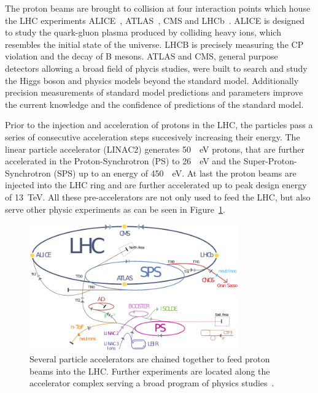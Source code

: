 The proton beams are brought to collision at four interaction points which house
the LHC experiments ALICE~\cite{ALICE}, ATLAS~\cite{ATLASa}, CMS and
LHCb~\cite{LHCb}. ALICE is designed to study the quark-gluon plasma produced by
colliding heavy ions, which resembles the initial state of the universe. LHCB is
precisely measuring the CP violation and the decay of B mesons. ATLAS and CMS,
general purpose detectors allowing a broad field of phycis studies, were built
to search and study the Higgs boson and physics models beyond the standard
model. Additionally precision measurements of standard model predictions and
parameters improve the current knowledge and the confidence of predictions of
the standard model.

Prior to the injection and acceleration of protons in the LHC, the particles
pass a series of consecutive acceleration steps succesively increasing their
energy. The linear particle accelerator (LINAC2) generates \SI{50}{\mega
\electronvolt} protons, that
are further accelerated in the Proton-Synchrotron (PS) to \SI{26}{\giga
\electronvolt} and
the Super-Proton-Synchrotron (SPS) up to an energy of \SI{450}{\giga
\electronvolt}. At last the proton beams are injected into the LHC ring and are
further accelerated up to peak design energy of \SI{13}{\tera\electronvolt}. All these
pre-accelerators are not only used to feed the LHC, but also serve other physic
experiments as can be seen in Figure~\ref{fig:lhc_complex}.

\begin{figure}[htp]
    \centering
    \includegraphics[width=0.8\textwidth]{figures/cms_detector/lhc_accelerator_chain.pdf}
    \caption[\CERN accelerator complex]{Several particle accelerators are
        chained together to feed proton beams into the LHC. Further experiments are
        located along the accelerator complex serving a broad program of physics
        studies~\cite{LHC:COMPLEX}.}
    \label{fig:lhc_complex}
\end{figure}

